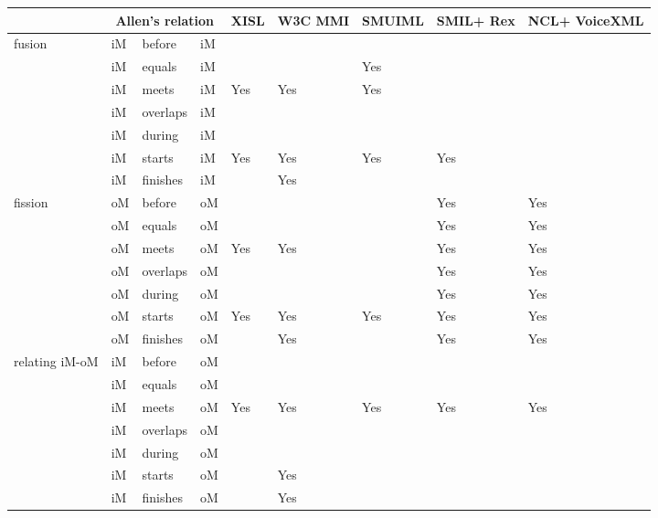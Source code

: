 \begin{table}[!ht]
\scriptsize
\begin{tabular}{ m{1.8cm} m{0.5cm} m{1cm} m{0.5cm} m{1cm} m{1cm}
m{1.5cm} m{1.5cm} m{1.5cm}}
	\hline
	& \multicolumn{3}{c}{\textbf{Allen’s relation}}
		& \textbf{XISL}	& \textbf{W3C MMI}	& \textbf{SMUIML}	&
		\textbf{SMIL+} \newline \textbf{Rex}	& \textbf{NCL+} \newline
		\textbf{VoiceXML} \\

	\hline
	\multirow{7}{*}{fusion}
	& iM &	before &		iM & & & & & \\
	& iM &	equals &		iM & & & Yes & & \\
	& iM &	meets &			iM & Yes & Yes & Yes & &\\
	& iM &	overlaps &	iM & & & & & \\
	& iM &	during &		iM & & & & & \\
	& iM &	starts &		iM & Yes & Yes & Yes & Yes & \\
	& iM &	finishes &	iM & & Yes & & & \\
	\hline

	\multirow{7}{*}{fission}
	& oM &	before &		oM & & & & Yes & Yes \\
	& oM &	equals &		oM & & & & Yes & Yes \\
	& oM &	meets &			oM & Yes & Yes & & Yes & Yes \\
	& oM &	overlaps &	oM & & & & Yes & Yes \\
	& oM &	during &		oM & & & & Yes & Yes \\
	& oM &	starts &		oM & Yes & Yes & Yes & Yes & Yes \\
	& oM &	finishes &	oM & & Yes & & Yes & Yes \\
	\hline

	\multirow{7}{*}{relating iM-oM}
	& iM &	before &		oM & & & & & \\
	& iM &	equals &		oM & & & & & \\
	& iM &	meets &			oM & Yes & Yes & Yes & Yes & Yes \\
	& iM &	overlaps &	oM & & & & & \\
	& iM &	during &		oM & & & & & \\
	& iM &	starts &		oM & & Yes & & & \\
	& iM &	finishes &	oM & & Yes & & & \\
	\hline


\end{tabular}
\end{table}
